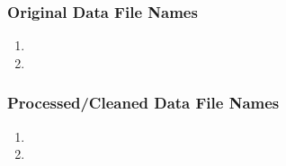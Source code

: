 \subsubsection*{Original Data File Names}

\begin{enumerate}
\item 
\item 
\end{enumerate}

\subsubsection*{Processed/Cleaned Data File Names}

\begin{enumerate}
\item 
\item 
\end{enumerate}
